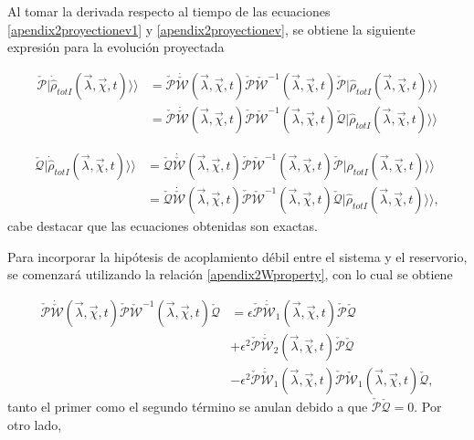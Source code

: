 \begin{appendixs}
Al tomar la derivada respecto al tiempo de las ecuaciones \ref{apendix2proyectionev1} y \ref{apendix2proyectionev}, se obtiene la siguiente expresión para la evolución proyectada

\begin{align*}
    \check{\mathcal{P}}|\dot{\hat{\rho}}_{totI}(\vec{\lambda},\vec{\chi},t) \rangle \rangle & = \check{\mathcal{P}}\dot{\check{\mathcal{W}}}(\vec{\lambda},\vec{\chi},t)\check{\mathcal{P}}\check{\mathcal{W}}^{-1}(\vec{\lambda},\vec{\chi},t)\check{\mathcal{P}}|\hat{\rho}_{totI}(\vec{\lambda},\vec{\chi},t)\rangle \rangle \\
     & = \check{\mathcal{P}}\dot{\check{\mathcal{W}}}(\vec{\lambda},\vec{\chi},t)\check{\mathcal{P}}\check{\mathcal{W}}^{-1}(\vec{\lambda},\vec{\chi},t)\check{\mathcal{Q}}|\hat{\rho}_{totI}(\vec{\lambda},\vec{\chi},t)\rangle \rangle 
\end{align*}

\begin{align*}
    \check{\mathcal{Q}}|\dot{\hat{\rho}}_{totI}(\vec{\lambda},\vec{\chi},t) \rangle \rangle & = \check{\mathcal{Q}}\dot{\check{\mathcal{W}}}(\vec{\lambda},\vec{\chi},t)\check{\mathcal{P}}\check{\mathcal{W}}^{-1}(\vec{\lambda},\vec{\chi},t)\check{\mathcal{P}}|\hat{\rho}_{totI}(\vec{\lambda},\vec{\chi},t)\rangle \rangle \\
     & = \check{\mathcal{Q}}\dot{\check{\mathcal{W}}}(\vec{\lambda},\vec{\chi},t)\check{\mathcal{P}}\check{\mathcal{W}}^{-1}(\vec{\lambda},\vec{\chi},t)\check{\mathcal{Q}}|\hat{\rho}_{totI}(\vec{\lambda},\vec{\chi},t)\rangle \rangle, 
\end{align*}
cabe destacar que las ecuaciones obtenidas son exactas. 

Para incorporar la hipótesis de acoplamiento débil entre el sistema y el reservorio, se comenzará utilizando la relación \ref{apendix2Wproperty}, con lo cual se obtiene

\begin{align*}
    \check{\mathcal{P}}\dot{\check{\mathcal{W}}}(\vec{\lambda},\vec{\chi},t)\check{\mathcal{P}}\check{\mathcal{W}}^{-1}(\vec{\lambda},\vec{\chi},t)\check{\mathcal{Q}} & = \epsilon \check{\mathcal{P}}\dot{\check{\mathcal{W}}}_{1}(\vec{\lambda},\vec{\chi},t) \check{\mathcal{P}}\check{\mathcal{Q}} \\
     & + \epsilon^{2} \check{\mathcal{P}}\dot{\check{\mathcal{W}}}_{2}(\vec{\lambda},\vec{\chi},t) \check{\mathcal{P}}\check{\mathcal{Q}} \\
     & - \epsilon^{2}\check{\mathcal{P}}\dot{\check{\mathcal{W}}}_{1}(\vec{\lambda},\vec{\chi},t)\check{\mathcal{P}} \check{\mathcal{W}}_{1}(\vec{\lambda},\vec{\chi},t)\check{\mathcal{Q}},
\end{align*}
tanto el primer como el segundo término se anulan debido a que \(\check{\mathcal{P}} \check{\mathcal{Q}} = 0\). Por otro lado, 


\end{appendixs}
